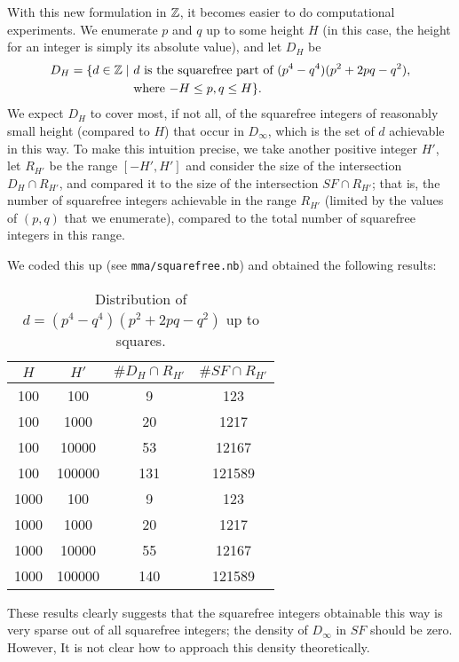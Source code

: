 With this new formulation in $\mathbb{Z}$, it becomes easier to do
computational experiments. We enumerate $p$ and $q$ up to some height
$H$ (in this case, the height for an integer is simply its absolute
value), and let $D_H$ be
\[
\begin{aligned}
  D_H = \{ d \in \mathbb{Z} \mid\ &
  \text{$d$ is the squarefree part of $(p^4 - q^4)(p^2 + 2pq - q^2)$},
  \\
  & \text{where $-H \le p, q \le H$}\}.
\end{aligned}
\]
We expect $D_H$ to cover most, if not all, of the squarefree integers
of reasonably small height (compared to $H$) that occur in $D_\infty$,
which is the set of $d$ achievable in this way. To make this intuition
precise, we take another positive integer $H'$, let $R_{H'}$ be the range
$[-H', H']$ and consider the size of the intersection $D_H \cap
R_{H'}$, and compared it to the size of the intersection $SF \cap
R_{H'}$; that is, the number of squarefree integers achievable in the
range $R_{H'}$ (limited by the values of $(p, q)$ that we enumerate),
compared to the total number of squarefree integers in this range.

We coded this up (see \texttt{mma/squarefree.nb}) and obtained the
following results:

\begin{table}[h]
  \centering
  \begin{tabular}{| c | c | c | c |}
    \hline
    $H$ & $H'$ & $\# D_H \cap R_{H'}$ & $\# SF \cap R_{H'}$ \\ \hline
    100 & 100 & 9 & 123 \\ \hline
    100 & 1000 & 20 & 1217 \\ \hline
    100 & 10000 & 53 & 12167 \\ \hline
    100 & 100000 & 131 & 121589 \\ \hline
    1000 & 100 & 9 & 123 \\ \hline
    1000 & 1000 & 20 & 1217 \\ \hline
    1000 & 10000 & 55 & 12167 \\ \hline
    1000 & 100000 & 140 & 121589 \\ \hline
  \end{tabular}
  \caption{Distribution of $d = (p^4 - q^4)(p^2 + 2pq - q^2)$ up to squares.}
\end{table}

These results clearly suggests that the squarefree integers obtainable
this way is very sparse out of all squarefree integers; the density of
$D_\infty$ in $SF$ should be zero. However, It is not clear how to
approach this density theoretically.

